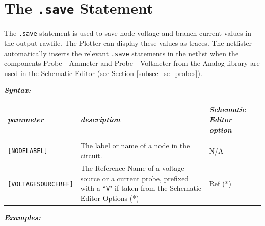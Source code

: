 \section{The \texttt{.save} Statement}
\label{subsec_satco_savestatement}

The \texttt{.save} statement is used to save node voltage and branch current values in the output rawfile. The Plotter can display these values as traces. The netlister automatically inserts the relevant \texttt{.save} statements in the netlist when the components \textsf{Probe - Ammeter} and \textsf{Probe - Voltmeter} from the \textsf{Analog} library are used in the Schematic Editor (see Section \ref{subsec_se_probes}).  


\textbf{\textit{Syntax:}}


\begin{tabular}{lp{5.5cm}p{5cm}}
\textit{parameter} & \textit{description} & \textit{Schematic Editor option}\\ \hline \\ \vspace{-0.8\parskip}
\texttt{[NODELABEL]} & The label or name of a node in the circuit. & \textsf{N/A} \\
\texttt{[VOLTAGESOURCEREF]} & {The Reference Name of a voltage source or a current probe, prefixed with a ``\texttt{V}" if taken from the Schematic Editor Options (*)} & \textsf{Ref} (*) 
\end{tabular}


\textbf{\textit{Examples:}}

